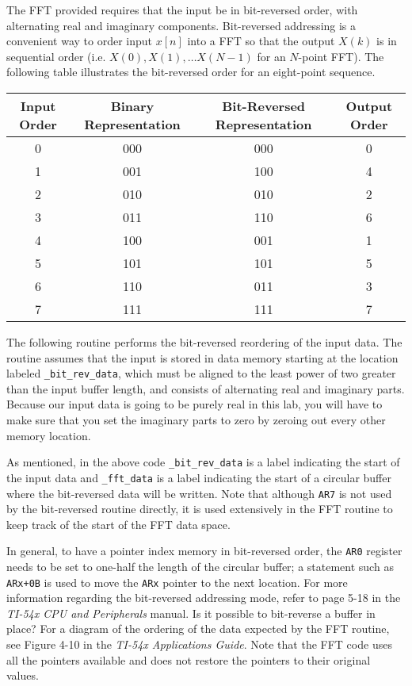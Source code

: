 The FFT provided requires that the input be in bit-reversed
order, with alternating real and imaginary components.
Bit-reversed
addressing is a convenient way to order input $x[n]$
into a FFT so that the output $X(k)$ is in sequential order
(i.e. $X(0), X(1),\ldots X(N-1)$ for an $N$-point FFT).
The following table illustrates the bit-reversed order for
an eight-point sequence.
\begin{center}
\begin{tabular}{|c|c|c|c|} \hline
Input Order & Binary Representation & Bit-Reversed Representation
& Output Order \\ \hline
0 & 000 & 000 & 0 \\
1 & 001 & 100 & 4 \\
2 & 010 & 010 & 2 \\
3 & 011 & 110 & 6 \\
4 & 100 & 001 & 1 \\
5 & 101 & 101 & 5 \\
6 & 110 & 011 & 3 \\
7 & 111 & 111 & 7 \\
\hline
\end{tabular}
\end{center}

The following routine performs the bit-reversed
reordering of the input data.  
The routine assumes that the input is stored in data memory
starting at the location labeled \verb+_bit_rev_data+, which must 
be aligned to the least power of two greater than the input buffer 
length, and consists of 
alternating real and imaginary parts.  
Because our input data is going to be purely real in this
lab, you will have to make sure that you set the imaginary
parts to zero by zeroing out every other memory location.

\setlength{\baselineskip}{0.39cm}
\setlength{\parskip}{0.4cm}
\setlength{\baselineskip}{0.5cm}
\setlength{\parskip}{0.5cm}

As mentioned, in the above code \verb+_bit_rev_data+ is a label indicating
the start of the input data and \verb+_fft_data+ is a label indicating 
the start of a circular buffer where the bit-reversed data will be written.
Note that although \verb+AR7+ is not
used by the bit-reversed routine directly, it is used extensively
in the FFT routine to keep track of the start of the FFT data space.

In general, to have a pointer index memory in bit-reversed order, the
\verb+AR0+ register needs to be set to one-half the length of
the circular buffer; a statement such as \verb!ARx+0B! is
used to move the \verb+ARx+ pointer to the next location.
For more information regarding the bit-reversed
addressing mode, refer to page 5-18 in the {\em TI-54x CPU and Peripherals}
manual.  Is it possible to bit-reverse a buffer in place?  For 
a diagram of the ordering of the data expected by the FFT routine, 
see Figure 4-10 in the {\em TI-54x Applications Guide}.  Note that the 
FFT code uses all the pointers available and does not 
restore the pointers to their original values.



